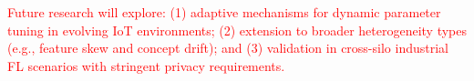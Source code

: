 \documentclass[journal,twoside,web]{ieeecolor}
\newcommand{\rev}[1]{\textcolor{red}{#1}}
\begin{document}
\rev{Future research will explore: (1) adaptive mechanisms for dynamic parameter tuning in evolving IoT environments; (2) extension to broader heterogeneity types (e.g., feature skew and concept drift); and (3) validation in cross-silo industrial FL scenarios with stringent privacy requirements.}




\end{document}
